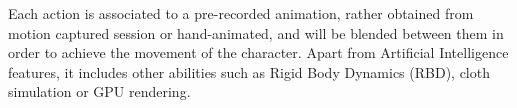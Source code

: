 Each action is associated to a pre-recorded animation, rather obtained from motion captured session or hand-animated, and will be blended between them in order to achieve the movement of the character. Apart from Artificial Intelligence features, it includes other abilities such as Rigid Body Dynamics (RBD), cloth simulation or GPU rendering. 



\ifx\isEmbedded\undefined


\pagebreak

\fi